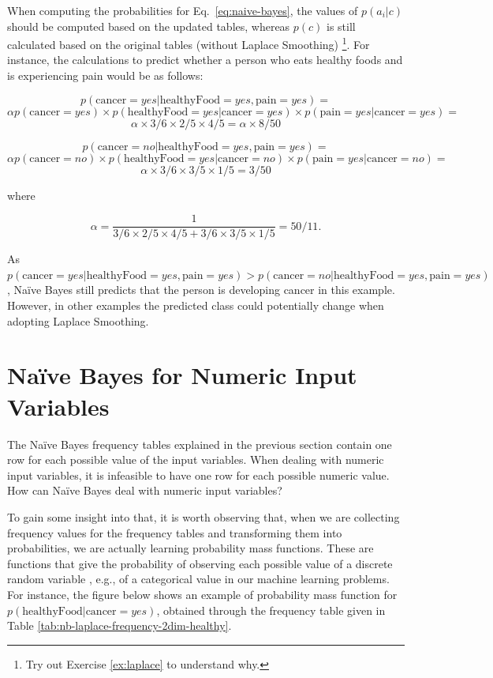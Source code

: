 When computing the probabilities for Eq.~\ref{eq:naive-bayes}, the values of $p(a_i|c)$ should be computed based on the updated tables, whereas $p(c)$ is still calculated based on the original tables (without Laplace Smoothing) \footnote{Try out Exercise \ref{ex:laplace} to understand why.}.  For instance, the calculations to predict whether a person who eats healthy foods and is experiencing pain would be as follows:

\[p(\text{cancer} = \textit{yes}| \text{healthyFood} = \textit{yes}, \text{pain} = \textit{yes}) = \]
\[\alpha p(\text{cancer} = \textit{yes}) \times p(\text{healthyFood} = yes | \text{cancer} = \textit{yes}) \times p(\text{pain} = yes | \text{cancer} = \textit{yes}) = \]
\[ \alpha \times 3/6 \times 2/5 \times 4/5 = \alpha \times 8/50\]

\vspace{0.5cm}
\[p(\text{cancer} = \textit{no}| \text{healthyFood} = \textit{yes}, \text{pain} = \textit{yes}) = \]
\[\alpha p(\text{cancer} = \textit{no}) \times p(\text{healthyFood} = \textit{yes} | \text{cancer} = \textit{no}) \times p(\text{pain} = \textit{yes} | \text{cancer} = \textit{no}) = \]
\[ \alpha \times 3/6 \times 3/5 \times 1/5 = 3/50\]

\noindent where 

\[\alpha = \frac{1}{3/6 \times 2/5 \times 4/5 + 3/6 \times 3/5 \times 1/5} = 50/11 .\]

\vspace{0.5cm}
As $p(\text{cancer} = \textit{yes}| \text{healthyFood} = \textit{yes}, \text{pain} = \textit{yes})  > p(\text{cancer} = \textit{no}| \text{healthyFood} = \textit{yes}, \text{pain} = \textit{yes})$, Na\"{i}ve Bayes still predicts that the person is developing cancer in this example. However, in other examples the predicted class could potentially change when adopting Laplace Smoothing.

\section{Na\"{i}ve Bayes for Numeric Input Variables}
\label{sec:nb-numeric}

The Na\"{i}ve Bayes frequency tables explained in the previous section contain one row for each possible value of the input variables. When dealing with numeric input variables, it is infeasible to have one row for each possible numeric value. How can Na\"{i}ve Bayes deal with numeric input variables?

To gain some insight into that, it is worth observing that, when we are collecting frequency values for the frequency tables and transforming them into probabilities, we are actually learning probability mass functions. These are functions that give the probability of observing each possible value of a discrete random variable \cite{RussellNorvig,MathsForML}, e.g., of a categorical value in our machine learning problems. For instance, the figure below shows an example of probability mass function for $p(\text{healthyFood}|\text{cancer} = \textit{yes})$, obtained through the frequency table given in Table \ref{tab:nb-laplace-frequency-2dim-healthy}.

